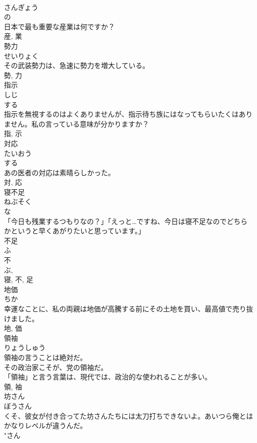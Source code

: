 \documentclass[8pt]{extreport}
\begin{document}
\begin{CJK}{UTF8}{min}
\\	さんぎょう	
\\	の 
\\	日本で最も重要な産業は何ですか？	
\\	産, 業	
\\	勢力	
\\	せいりょく	
\\	その武装勢力は、急速に勢力を増大している。	
\\	勢, 力	
\\	指示	
\\	しじ	
\\	する 
\\	指示を無視するのはよくありませんが、指示待ち族にはなってもらいたくはありません。私の言っている意味が分かりますか？	
\\	指, 示	
\\	対応	
\\	たいおう	
\\	する 
\\	あの医者の対応は素晴らしかった。	
\\	対, 応	
\\	寝不足	
\\	ねぶそく	
\\	な 
\\	「今日も残業するつもりなの？」「えっと…ですね、今日は寝不足なのでどちらかというと早くあがりたいと思っています。」	
\\	不足 
\\	ふ 
\\	不 
\\	ぶ, 
\\	寝, 不, 足	
\\	地価	
\\	ちか	
\\	幸運なことに、私の両親は地価が高騰する前にその土地を買い、最高値で売り抜けました。	
\\	地, 価	
\\	領袖	
\\	りょうしゅう	
\\	領袖の言うことは絶対だ。	
\\	その政治家こそが、党の領袖だ。	
\\	「領袖」と言う言葉は、現代では、政治的な使われることが多い。	
\\	領, 袖	
\\	坊さん	
\\	ぼうさん	
\\	くそ、彼女が付き合ってた坊さんたちには太刀打ちできないよ。あいつら俺とはかなりレベルが違うんだ。	
\\	"さん 

\end{CJK}
\end{document}
